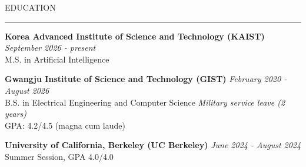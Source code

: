 \documentclass{resume} %
\renewenvironment{rSection}[2][]{
\vspace{-0.5 em} %
\sectionskip
\noindent\textcolor{RoyalPurple}{\MakeUppercase{#2}}\hfill{\footnotesize #1}\par
\sectionlineskip
\hrule
\begin{list}{}{
\setlength{\leftmargin}{1.5em}
}
\item[]
}{
\end{list}
}
\begin{document}

\begin{rSection}{Education}


{\bf Korea Advanced Institute of Science and Technology (KAIST)} \hfill {\em September 2026 - present}{}
\\ M.S. in Artificial Intelligence \hfill

{\bf Gwangju Institute of Science and Technology (GIST)} \hfill {\em February 2020 - August 2026}{}
\\ B.S. in Electrical Engineering and Computer Science \hfill {\small\em Military service leave (2 years)}
\\ GPA: 4.2/4.5 (magna cum laude) \hfill

{\bf University of California, Berkeley (UC Berkeley)} \hfill {\em June 2024 - August 2024}
\\ Summer Session, GPA 4.0/4.0 \hfill

\end{rSection}
\end{document}
